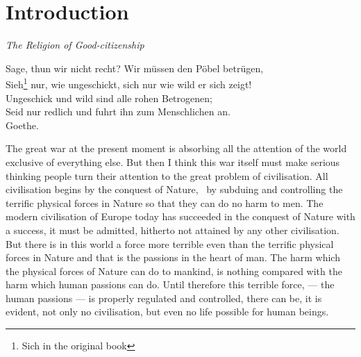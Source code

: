 \chapter{Introduction}
\begin{center}
    \emph{The Religion of Good-citizenship}
\end{center}
\begin{center}\footnotesize
   Sage, thun  wir nicht recht? Wir m\"ussen den P\"obel betr\"ugen,\\
   Sieh\footnote{Sich in the original book} nur, wie ungeschickt, sich nur wie wild er sich zeigt!\\
   Ungeschick und wild sind alle rohen Betrogenen;\\
   Seid nur redlich und fuhrt ihn zum Menschlichen an.\\
    \hfill Goethe\cite{num11}.
\end{center}

The great war at the present moment is absorbing all the attention of the world exclusive of everything else.
But then I think this war itself must make serious thinking people turn their attention to the great problem of civilisation.
All civilisation begins by the conquest of Nature, \ie\, by subduing and controlling the terrific physical forces in Nature so that they can do no harm to men.
The modern civilisation of Europe today has succeeded in the conquest of Nature with a success, it must be admitted, hitherto not attained by any other civilisation.
But there is in this world a force more terrible even than the terrific physical forces in Nature and that is the passions in the heart of man.
The harm which the physical forces of Nature can do to mankind, is nothing compared with the harm which human passions can do.
Until therefore this terrible force, --- the human passions --- is properly regulated and controlled, there can be, it is evident, not only no civilisation, but even no life possible for human beings.

